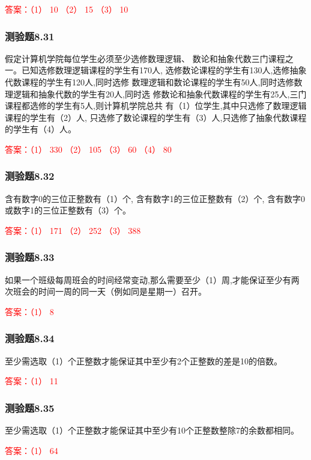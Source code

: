 \documentclass[UTF8, heading=true]{ctexart}
\begin{document}
\textcolor{red}{答案：（1） 10 （2） 15 （3） 10}

\subsubsection{测验题8.31}

假定计算机学院每位学生必须至少选修数理逻辑、
数论和抽象代数三门课程之一。已知选修数理逻辑课程的学生有170人,
选修数论课程的学生有130人,选修抽象代数课程的学生有120人,同时选修
数理逻辑和数论课程的学生有50人,同时选修数理逻辑和抽象代数的学生有20人,同时选
修数论和抽象代数课程的学生有25人,三门课程都选修的学生有5人,则计算机学院总共
有（1）位学生,其中只选修了数理逻辑课程的学生有（2）人,
只选修了数论课程的学生有（3）人,只选修了抽象代数课程的学生有（4）人。

\textcolor{red}{答案：（1） 330 （2） 105 （3） 60 （4） 80}


\subsubsection{测验题8.32}

含有数字0的三位正整数有（1）个,
含有数字1的三位正整数有（2）个,
含有数字0或数字1的三位正整数有（3）个。

\textcolor{red}{答案：（1） 171 （2） 252 （3） 388}

\subsubsection{测验题8.33}

如果一个班级每周班会的时间经常变动,那么需要至少（1）周,才能保证至少有两次班会的时间一周的同一天（例如同是星期一）召开。

\textcolor{red}{答案：（1） 8}


\subsubsection{测验题8.34}

至少需选取（1）个正整数才能保证其中至少有2个正整数的差是10的倍数。

\textcolor{red}{答案：（1） 11}

\subsubsection{测验题8.35}
至少需选取（1）个正整数才能保证其中至少有10个正整数整除7的余数都相同。

\textcolor{red}{答案：（1） 64}
\end{document}
